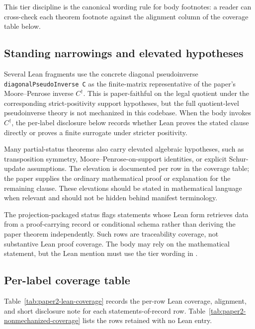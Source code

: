 \documentclass[11pt]{article}
\theoremstyle{definition}
\begin{document}
This tier discipline is the canonical wording rule for body footnotes: a
reader can cross-check each theorem footnote against the alignment column of
the coverage table below.

\subsection{Standing narrowings and elevated hypotheses}
\label{subsec:paper2-standing-narrowings}

Several Lean fragments use the concrete diagonal pseudoinverse
\texttt{diagonalPseudoInverse C} as the finite-matrix representative of the
paper's Moore--Penrose inverse \(C^\dagger\).  This is paper-faithful on the
legal quotient under the corresponding strict-positivity support hypotheses,
but the full quotient-level pseudoinverse theory is not mechanized in this
codebase.  When the body invokes \(C^\dagger\), the per-label disclosure below
records whether Lean proves the stated clause directly or proves a finite
surrogate under stricter positivity.

Many partial-status theorems also carry elevated algebraic hypotheses, such as
transposition symmetry, Moore--Penrose-on-support identities, or explicit
Schur-update assumptions.  The elevation is documented per row in the coverage
table; the paper supplies the ordinary mathematical proof or explanation for
the remaining clause.  These elevations should be stated in mathematical
language when relevant and should not be hidden behind manifest terminology.

The projection-packaged status flags statements whose Lean form retrieves data
from a proof-carrying record \citep{Necula1997ProofCarryingCode} or
conditional schema rather than deriving the paper theorem independently.  Such rows are traceability coverage, not
substantive Lean proof coverage.  The body may rely on the mathematical
statement, but the Lean mention must use the tier wording in
.

\subsection{Per-label coverage table}
\label{subsec:paper2-per-label-coverage}
\label{subsec:paper2-coverage-table}

Table~\ref{tab:paper2-lean-coverage} records the per-row Lean
coverage, alignment, and short disclosure note for each
statements-of-record row.
Table~\ref{tab:paper2-nonmechanized-coverage} lists the rows
retained with no Lean entry.
\end{document}
